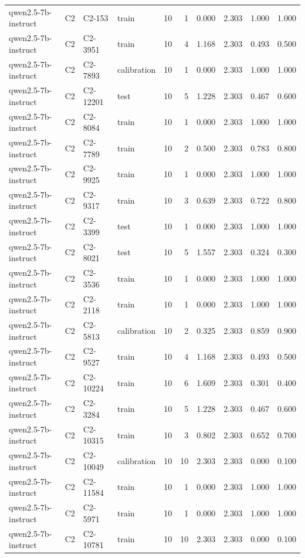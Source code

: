 \begin{table}
\begin{tabular}{llllrrrrrr}
qwen2.5-7b-instruct & C2 & C2-153 & train & 10 & 1 & 0.000 & 2.303 & 1.000 & 1.000 \\
qwen2.5-7b-instruct & C2 & C2-3951 & train & 10 & 4 & 1.168 & 2.303 & 0.493 & 0.500 \\
qwen2.5-7b-instruct & C2 & C2-7893 & calibration & 10 & 1 & 0.000 & 2.303 & 1.000 & 1.000 \\
qwen2.5-7b-instruct & C2 & C2-12201 & test & 10 & 5 & 1.228 & 2.303 & 0.467 & 0.600 \\
qwen2.5-7b-instruct & C2 & C2-8084 & train & 10 & 1 & 0.000 & 2.303 & 1.000 & 1.000 \\
qwen2.5-7b-instruct & C2 & C2-7789 & train & 10 & 2 & 0.500 & 2.303 & 0.783 & 0.800 \\
qwen2.5-7b-instruct & C2 & C2-9925 & train & 10 & 1 & 0.000 & 2.303 & 1.000 & 1.000 \\
qwen2.5-7b-instruct & C2 & C2-9317 & train & 10 & 3 & 0.639 & 2.303 & 0.722 & 0.800 \\
qwen2.5-7b-instruct & C2 & C2-3399 & test & 10 & 1 & 0.000 & 2.303 & 1.000 & 1.000 \\
qwen2.5-7b-instruct & C2 & C2-8021 & test & 10 & 5 & 1.557 & 2.303 & 0.324 & 0.300 \\
qwen2.5-7b-instruct & C2 & C2-3536 & train & 10 & 1 & 0.000 & 2.303 & 1.000 & 1.000 \\
qwen2.5-7b-instruct & C2 & C2-2118 & train & 10 & 1 & 0.000 & 2.303 & 1.000 & 1.000 \\
qwen2.5-7b-instruct & C2 & C2-5813 & calibration & 10 & 2 & 0.325 & 2.303 & 0.859 & 0.900 \\
qwen2.5-7b-instruct & C2 & C2-9527 & train & 10 & 4 & 1.168 & 2.303 & 0.493 & 0.500 \\
qwen2.5-7b-instruct & C2 & C2-10224 & train & 10 & 6 & 1.609 & 2.303 & 0.301 & 0.400 \\
qwen2.5-7b-instruct & C2 & C2-3284 & train & 10 & 5 & 1.228 & 2.303 & 0.467 & 0.600 \\
qwen2.5-7b-instruct & C2 & C2-10315 & train & 10 & 3 & 0.802 & 2.303 & 0.652 & 0.700 \\
qwen2.5-7b-instruct & C2 & C2-10049 & calibration & 10 & 10 & 2.303 & 2.303 & 0.000 & 0.100 \\
qwen2.5-7b-instruct & C2 & C2-11584 & train & 10 & 1 & 0.000 & 2.303 & 1.000 & 1.000 \\
qwen2.5-7b-instruct & C2 & C2-5971 & train & 10 & 1 & 0.000 & 2.303 & 1.000 & 1.000 \\
qwen2.5-7b-instruct & C2 & C2-10781 & train & 10 & 10 & 2.303 & 2.303 & 0.000 & 0.100 \\

\end{tabular}
\end{table}
